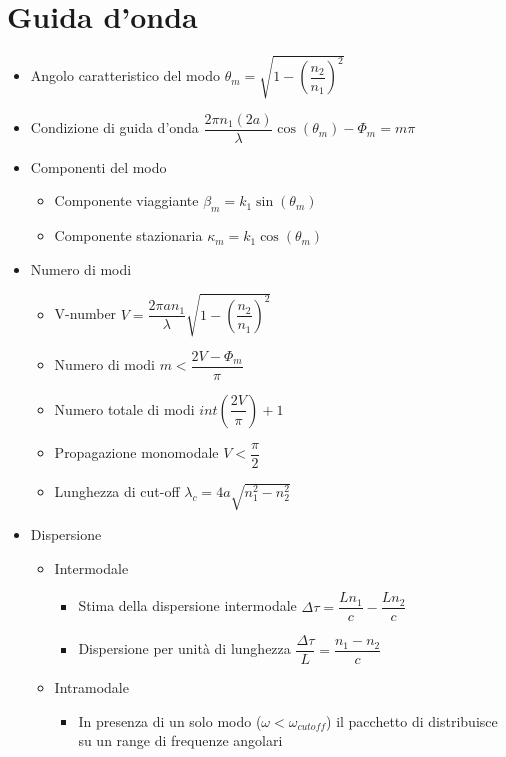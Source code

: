 \documentclass{article}
\begin{document}
\section{Guida d'onda}
\begin{itemize}
  \item Angolo caratteristico del modo \( \theta_m = \sqrt{1 - \left(\dfrac{n_2}{n_1} \right) ^ 2} \)
  \item Condizione di guida d'onda \( \dfrac{2 \pi n_1 (2 a)}{\lambda} \cos(\theta_m) - \Phi_m = m \pi \)
  \item Componenti del modo
        \begin{itemize}
          \item Componente viaggiante \( \beta_m = k_1 \sin(\theta_m)\)
          \item Componente stazionaria \( \kappa_m = k_1 \cos(\theta_m) \)
        \end{itemize}
  \item Numero di modi
        \begin{itemize}
          \item V-number \(\displaystyle V = \dfrac{2 \pi a n_1}{\lambda} \sqrt{1 - \left(\dfrac{n_2}{n_1}\right) ^ 2} \)
          \item Numero di modi \( m < \dfrac{2V - \Phi_m}{\pi} \)
          \item Numero totale di modi \( int\left(\dfrac{2V}{\pi} \right) + 1 \)
          \item Propagazione monomodale \( V < \dfrac{\pi}{2} \)
          \item Lunghezza di cut-off \( \displaystyle \lambda_c = 4a \sqrt{n_1^2 - n_2^2} \)
        \end{itemize}
  \item Dispersione
        \begin{itemize}
          \item Intermodale
                \begin{itemize}
                  \item Stima della dispersione intermodale \( \Delta \tau = \dfrac{L n_1}{c} - \dfrac{L n_2}{c} \)
                  \item Dispersione per unità di lunghezza \(  \dfrac{\Delta \tau}{L} = \dfrac{n_1 - n_2}{c} \)
                \end{itemize}
          \item Intramodale
                \begin{itemize}
                  \item In presenza di un solo modo (\( \omega < \omega_{cutoff} \)) il pacchetto di distribuisce su un range di frequenze angolari

\end{itemize}
\end{itemize}
\end{itemize}
\end{document}
